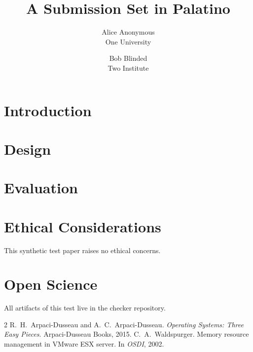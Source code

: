 \documentclass[letterpaper,twocolumn,10pt]{article}
\date{}
\title{\Large \bf A Submission Set in Palatino}
\author{{\rm Alice Anonymous}\\One University \and {\rm Bob Blinded}\\Two Institute}
\begin{document}
\maketitle

\begin{abstract}
\lipsum[1][1-5]
\end{abstract}

\section{Introduction}
\lipsum[2-4]

\section{Design}
\lipsum[5-7]

\section{Evaluation}
\lipsum[8-9]

\appendix
\section*{Ethical Considerations}
This synthetic test paper raises no ethical concerns.

\section*{Open Science}
All artifacts of this test live in the checker repository.

\begin{thebibliography}{2}
 R.~H.\ Arpaci-Dusseau and A.~C.\ Arpaci-Dusseau.
  \emph{Operating Systems: Three Easy Pieces}. Arpaci-Dusseau Books, 2015.
 C.~A.\ Waldspurger. Memory resource management in VMware ESX
  server. In \emph{OSDI}, 2002.
\end{thebibliography}
\end{document}

